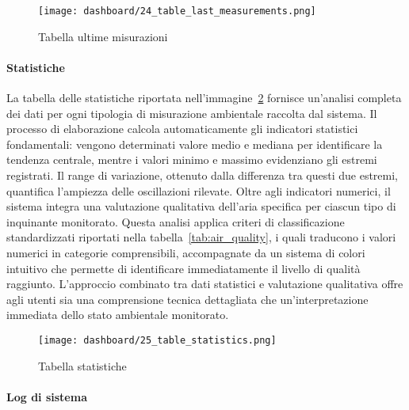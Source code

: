 \begin{figure}[H]
  \centering
  \texttt{[image: dashboard/24\_table\_last\_measurements.png]}
  \caption{Tabella ultime misurazioni}
  \label{fig:app-tab-last-measurements}
\end{figure}

\newpage

\paragraph{Statistiche}

La tabella delle statistiche riportata nell'immagine~\ref{fig:app-tab-statistics} fornisce un'analisi completa
dei dati per ogni tipologia di misurazione ambientale raccolta dal sistema. Il processo di elaborazione calcola
automaticamente gli indicatori statistici fondamentali: vengono determinati valore medio e mediana
per identificare la tendenza centrale, mentre i valori minimo e massimo evidenziano gli estremi registrati.
Il range di variazione, ottenuto dalla differenza tra questi due estremi, quantifica l'ampiezza
delle oscillazioni rilevate.
Oltre agli indicatori numerici, il sistema integra una valutazione qualitativa dell'aria specifica
per ciascun tipo di inquinante monitorato.
Questa analisi applica criteri di classificazione standardizzati riportati nella tabella~\ref{tab:air_quality},
i quali traducono i valori numerici in categorie comprensibili, accompagnate da un sistema di colori intuitivo
che permette di identificare immediatamente il livello di qualità raggiunto.
L'approccio combinato tra dati statistici e valutazione qualitativa offre agli utenti sia una comprensione
tecnica dettagliata che un'interpretazione immediata dello stato ambientale monitorato.

\begin{figure}[H]
  \centering
  \texttt{[image: dashboard/25\_table\_statistics.png]}
  \caption{Tabella statistiche}
  \label{fig:app-tab-statistics}
\end{figure}

\newpage

\paragraph{Log di sistema}

